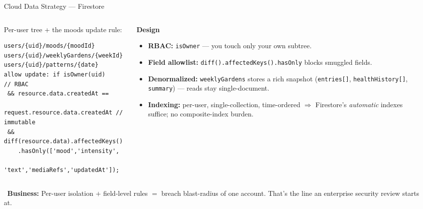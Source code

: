 \documentclass[aspectratio=169,11pt]{beamer}
\providecommand{\faChartPie}{}
\newcommand{\biz}[1]{\vspace{0.3em}\par{\footnotesize\color{moodorange}\faChartPie\ \textbf{Business:} #1}}
\begin{document}
\begin{frame}[fragile]{Cloud Data Strategy --- Firestore}
\begin{columns}[T,onlytextwidth]
  \begin{column}{0.52\textwidth}
{\scriptsize Per-user tree + the moods update rule:}
\begin{lstlisting}[style=rulestyle]
users/{uid}/moods/{moodId}
users/{uid}/weeklyGardens/{weekId}
users/{uid}/patterns/{date}
allow update: if isOwner(uid)      // RBAC
 && resource.data.createdAt ==
    request.resource.data.createdAt // immutable
 && diff(resource.data).affectedKeys()
    .hasOnly(['mood','intensity',
      'text','mediaRefs','updatedAt']);
\end{lstlisting}
  \end{column}
  \begin{column}{0.46\textwidth}
    \textbf{\color{moodgreen}Design}
    \begin{itemize}\footnotesize
      \item \textbf{RBAC:} \texttt{isOwner} --- you touch only your own subtree.
      \item \textbf{Field allowlist:} \texttt{diff().affectedKeys().hasOnly} blocks smuggled fields.
      \item \textbf{Denormalized:} \texttt{weeklyGardens} stores a rich snapshot (\texttt{entries[]}, \texttt{healthHistory[]}, \texttt{summary}) --- reads stay single-document.
      \item \textbf{Indexing:} per-user, single-collection, time-ordered $\Rightarrow$ Firestore's \emph{automatic} indexes suffice; no composite-index burden.
    \end{itemize}
  \end{column}
\end{columns}
\biz{Per-user isolation $+$ field-level rules $=$ breach blast-radius of one account. That's the line an enterprise security review starts at.}
\end{frame}

\end{document}
